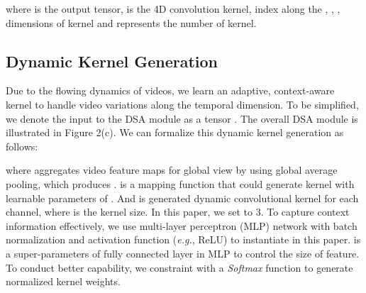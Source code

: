 \documentclass[sigconf]{acmart}
\begin{document}
where  is the output tensor,  is the 4D convolution kernel,  index along the , , ,  dimensions of kernel and  represents the number of kernel.


\subsection{Dynamic Kernel Generation}
Due to the flowing dynamics of videos, we learn an adaptive, context-aware kernel to handle video variations along the temporal dimension.
To be simplified, we denote the input to the DSA module as a tensor .
The overall DSA module is illustrated in Figure 2(c).
We can formalize this dynamic kernel generation as follows:


where  aggregates video feature maps  for global view by using global average pooling, which produces .
 is a mapping function that could generate kernel  with learnable parameters of .
And  is generated dynamic convolutional kernel for each channel, where  is the kernel size. In this paper, we set  to 3.
To capture context information effectively, we use multi-layer perceptron (MLP) network with batch normalization and activation function (\emph{e.g.}, ReLU) to instantiate  in this paper.
 is a super-parameters of fully connected layer in MLP to control the size of feature.
To conduct better capability, we constraint  with a \emph{Softmax} function to generate normalized kernel weights.

\newcommand{\blocks}[3]{\multirow{3}{*}{-.1em] \text{13, #2}\#3}
	}
	\newcommand{\blockt}[3]{\multirow{3}{*}{-.1em] \text{13, #2}\#3}
	}
	
\end{document}
